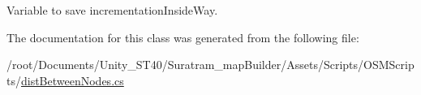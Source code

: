 Variable to save \textquotesingle{}incrementation\+Inside\+Way\textquotesingle{}.



The documentation for this class was generated from the following file\+:\begin{DoxyCompactItemize}
\item 
/root/\+Documents/\+Unity\+\_\+\+S\+T40/\+Suratram\+\_\+map\+Builder/\+Assets/\+Scripts/\+O\+S\+M\+Scripts/\hyperlink{distBetweenNodes_8cs}{dist\+Between\+Nodes.\+cs}\end{DoxyCompactItemize}
